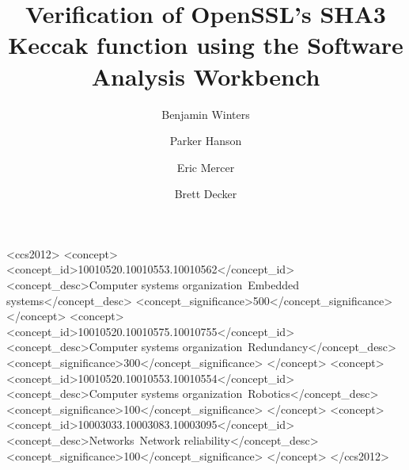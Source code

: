 \documentclass[sigplan, 10pt, anonymous, review]{acmart}\settopmatter{printfolios=true,printccs=false,printacmref=false}
\begin{document}
\title{Verification of OpenSSL's SHA3 Keccak function using the Software Analysis Workbench}

\author{Benjamin Winters}
\author{Parker Hanson}
\author{Eric Mercer}
\author{Brett Decker}







\begin{CCSXML}
<ccs2012>
 <concept>
  <concept_id>10010520.10010553.10010562</concept_id>
  <concept_desc>Computer systems organization~Embedded systems</concept_desc>
  <concept_significance>500</concept_significance>
 </concept>
 <concept>
  <concept_id>10010520.10010575.10010755</concept_id>
  <concept_desc>Computer systems organization~Redundancy</concept_desc>
  <concept_significance>300</concept_significance>
 </concept>
 <concept>
  <concept_id>10010520.10010553.10010554</concept_id>
  <concept_desc>Computer systems organization~Robotics</concept_desc>
  <concept_significance>100</concept_significance>
 </concept>
 <concept>
  <concept_id>10003033.10003083.10003095</concept_id>
  <concept_desc>Networks~Network reliability</concept_desc>
  <concept_significance>100</concept_significance>
 </concept>
</ccs2012>
\end{CCSXML}
\end{document}
